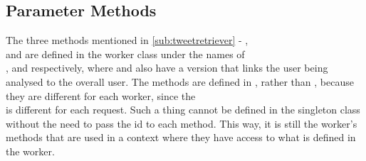 \subsection{Parameter Methods}
The three methods mentioned in \autoref{sub:tweetretriever} -
,  \\and {} are defined in
the worker class under the names of \\,
 and  respectively, where
 and  also have a version
that links the user being analysed to the overall user. The methods are defined
in , rather than , because they are
different for each worker, since the \\ is different for
each request. Such a thing cannot be defined in the singleton class without the need
to pass the id to each method. This way, it is still the worker's methods that
are used in a context where they have access to what is defined in the worker.